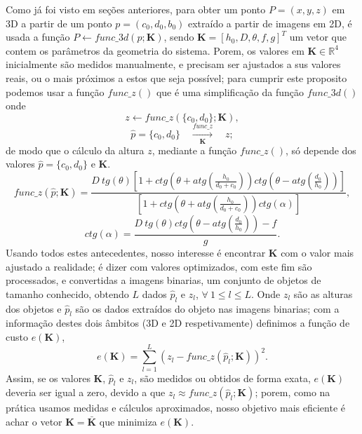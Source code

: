 \documentclass[a4paper, 12pt]{article}
\begin{document}
Como já foi visto em seções anteriores, para obter um ponto $P=(x,y,z)$ em 3D a partir de um ponto 
$p=(c_0,d_0,b_0)$ extraído a partir de imagens em 2D, é usada a função
$P \leftarrow func\_3d(p;\mathbf{K})$, sendo $\mathbf{K}=[h_0,D,\theta,f,g]^T$
um vetor que contem os parâmetros da geometria do sistema.
Porem, os valores em $\mathbf{K}\in \mathbb{R}^4$ inicialmente são medidos manualmente,
e precisam ser ajustados a sus valores reais, ou o mais próximos a estos que seja possível;
para cumprir este proposito podemos usar a função $func\_z()$ que é
uma simplificação da função $func\_3d()$ onde 
\begin{equation}
z \leftarrow func\_z(\{c_0,d_0\};\mathbf{K}),
\end{equation}
\begin{equation}
\hat{p}=\{c_0,d_0\}\quad \xrightarrow[\mathbf{K}]{func\_z} \quad z;
\end{equation}
de modo que o cálculo da altura $z$, mediante a função $func\_z()$,
só depende dos valores $\hat{p}=\{c_0,d_0\}$ e $\mathbf{K}$.
\begin{equation}\label{eq:setupz1}
func\_z(\hat{p};\mathbf{K})=\frac{
D~tg(\theta)
\left[
1+ ctg\left(\theta+atg\left(\frac{h_0}{d_0+c_0}\right)\right) ctg\left(\theta-atg\left(\frac{d_0}{h_0}\right)\right) 
\right]
}{
\left[1+ctg\left(\theta+atg\left(\frac{h_0}{d_0+c_0}\right)\right) ctg(\alpha)\right]
},
\end{equation}
\begin{equation}\label{eq:setupz2}
ctg(\alpha)=\frac{D~tg(\theta)ctg\left(\theta-atg\left(\frac{d_0}{h_0}\right)\right)- f}{g}.
\end{equation}
Usando todos estes antecedentes, nosso interesse é encontrar $\mathbf{K}$
com o valor mais ajustado a realidade; é dizer com valores optimizados,
com este fim são processados, e convertidas a imagens binarias, 
um conjunto de objetos de tamanho conhecido,
obtendo $L$ dados $\hat{p}_l$ e $z_l$, $\forall~1\leq l \leq L$.
Onde $z_l$ são as alturas dos objetos e $\hat{p}_l$ 
são os dados extraídos do objeto nas imagens binarias;
com a informação destes dois âmbitos (3D e 2D respetivamente)
definimos a função de custo $e\left(\mathbf{K}\right)$,
\begin{equation}\label{eq:setupz3}
e\left(\mathbf{K}\right)=\sum_{l=1}^{L} \left(z_l-func\_z(\hat{p}_l;\mathbf{K})\right)^2.
\end{equation}
Assim, se os valores $\mathbf{K}$, $\hat{p}_l$ e $z_l$, são medidos ou obtidos de forma exata,
$e\left(\mathbf{K}\right)$ deveria ser igual a zero, devido a que $z_l\approx func\_z(\hat{p}_l;\mathbf{K})$;
porem, como na prática usamos medidas e cálculos aproximados,
nosso objetivo mais eficiente é achar o vetor 
$\mathbf{K}=\mathbf{\bar{K}}$  que minimiza $e\left(\mathbf{K}\right)$.
\end{document}
